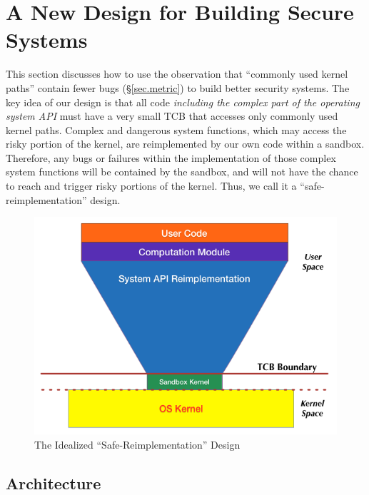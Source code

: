 \section{A New Design for Building Secure Systems}
\label{sec.design}

This section discusses how to use the observation
 that ``commonly used kernel paths'' contain fewer bugs 
(\S{\ref{sec.metric}}) to build better security systems.
The key idea of our design is that all code \emph{including the complex part
of the operating system API} must have a very small TCB that accesses only 
commonly used kernel paths. 
Complex and dangerous system functions, which may access the risky portion of the kernel, 
are reimplemented by our own code within a sandbox. 
Therefore, any bugs or failures within the implementation of those complex system functions 
will be contained by the sandbox, and will not have the chance to reach 
and trigger risky portions of the kernel. Thus, we call it a ``safe-reimplementation'' design.

\begin{figure}[h]
\centering
\includegraphics[width=1.0\columnwidth]{diagram/lind_secure_design.png}
\caption{The Idealized ``Safe-Reimplementation'' Design }
\label{fig:design}
\end{figure}

\subsection{Architecture}


